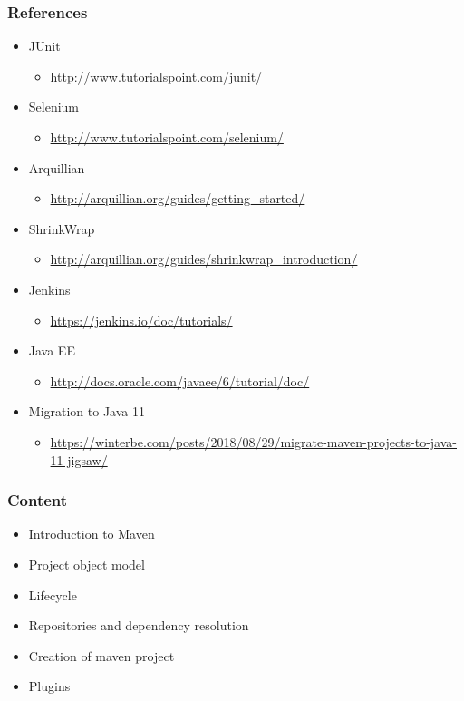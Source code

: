 \documentclass[10pt,xcolor=pdflatex]{beamer}
\begin{document}
\begin{frame}\frametitle{References}
\begin{itemize}
	\item JUnit
	  \begin{itemize}
		\item \url{http://www.tutorialspoint.com/junit/}
	  \end{itemize}
    \item Selenium
      \begin{itemize}
    	\item \url{http://www.tutorialspoint.com/selenium/}
      \end{itemize}
    \item Arquillian
      \begin{itemize}
    	\item \url{http://arquillian.org/guides/getting_started/}
      \end{itemize}
    \item ShrinkWrap
      \begin{itemize}
    	\item \footnotesize{\url{http://arquillian.org/guides/shrinkwrap_introduction/}}
      \end{itemize}
    \item Jenkins
	  \begin{itemize}
		\item \url{https://jenkins.io/doc/tutorials/}
	  \end{itemize}
    \item Java EE
      \begin{itemize}
        \item \url{http://docs.oracle.com/javaee/6/tutorial/doc/}
      \end{itemize}
    \item Migration to Java 11
      \begin{itemize}
          \item \url{https://winterbe.com/posts/2018/08/29/migrate-maven-projects-to-java-11-jigsaw/}
      \end{itemize}
\end{itemize}
\end{frame}




\begin{frame}\frametitle{Content}
\begin{itemize}
	\item Introduction to Maven
    \item Project object model
    \item Lifecycle
    \item Repositories and dependency resolution
    \item Creation of maven project
    \item Plugins
\end{itemize}
\end{frame}
\end{document}
